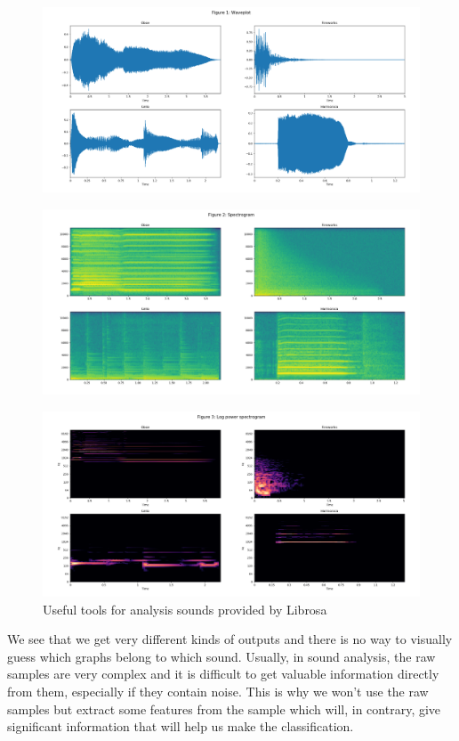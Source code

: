 \documentclass{article} %
\begin{document}
		\begin{figure}[H]
		  \includegraphics[width=\linewidth]{waveplot.png}
	  	\end{figure}
	  	\begin{figure}[H]
		  \includegraphics[width=\linewidth]{spectrogram.png}
	  	\end{figure}
	  	\begin{figure}[H]
		  \includegraphics[width=\linewidth]{logspectrogram.png}
		  \caption{Useful tools for analysis sounds provided by Librosa}
		  \label{fig:graphs}
		\end{figure}

		We see that we get very different kinds of outputs and there is no way to visually guess which graphs belong to which sound.
		Usually, in sound analysis, the raw samples are very complex and it is difficult to get valuable information directly from them, especially if they contain noise.
		This is why we won't use the raw samples but extract some features from the sample which will, in contrary, give significant information that will help us make the classification.
\end{document}
